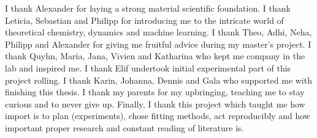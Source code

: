 I thank Alexander for laying a strong material scientific foundation.
I thank Leticia, Sebastian and Philipp for introducing me to the intricate world of theoretical chemistry, dynamics and machine learning. 
I thank Theo, Adhi, Neha, Philipp and Alexander for giving me fruitful advice during my master's project.
I thank Quyhn, Maria, Jana, Vivien and Katharina who kept me company in the lab and inspired me. 
I thank Elif undertook initial experimental part of this project rolling.
I thank Karin, Johanna, Dennis and Gala who supported me with finishing this thesis. 
I thank my parents for my upbringing, teaching me to stay curious and to never give up.
Finally, I thank this project which taught me how import is to plan (experiments), chose fitting methods, act reproducibly and how important proper research and constant reading of literature is. 
